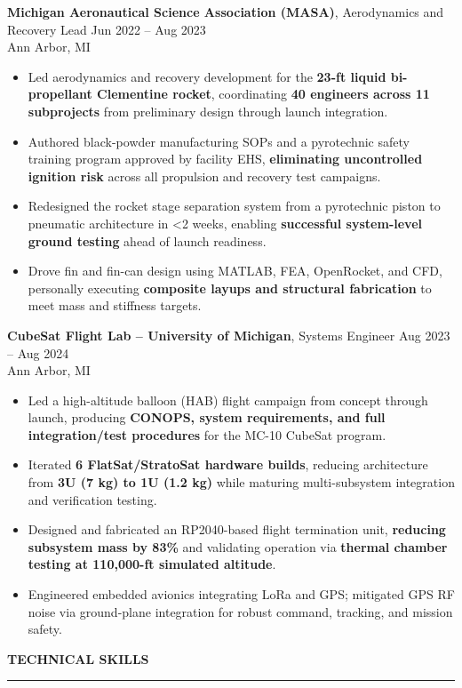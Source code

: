 \documentclass[10pt]{article}
\newcommand{\ressection}[1]{
  \vspace{0.12em}
  {\large\bfseries #1}\par
  \vspace{0.05em}\hrule\vspace{0.12em}
}
\begin{document}
{\bfseries Michigan Aeronautical Science Association (MASA)}, Aerodynamics and Recovery Lead \hfill Jun 2022 -- Aug 2023 \\
Ann Arbor, MI
\begin{itemize}
  \item Led aerodynamics and recovery development for the \textbf{23-ft liquid bi-propellant Clementine rocket}, coordinating \textbf{40 engineers across 11 subprojects} from preliminary design through launch integration.
  \item Authored black-powder manufacturing SOPs and a pyrotechnic safety training program approved by facility EHS, \textbf{eliminating uncontrolled ignition risk} across all propulsion and recovery test campaigns.
  \item Redesigned the rocket stage separation system from a pyrotechnic piston to pneumatic architecture in <2 weeks, enabling \textbf{successful system-level ground testing} ahead of launch readiness.
  \item Drove fin and fin-can design using MATLAB, FEA, OpenRocket, and CFD, personally executing \textbf{composite layups and structural fabrication} to meet mass and stiffness targets.
\end{itemize}

{\bfseries CubeSat Flight Lab -- University of Michigan}, Systems Engineer \hfill Aug 2023 -- Aug 2024 \\
Ann Arbor, MI
\begin{itemize}
  \item Led a high-altitude balloon (HAB) flight campaign from concept through launch, producing \textbf{CONOPS, system requirements, and full integration/test procedures} for the MC-10 CubeSat program.
  \item Iterated \textbf{6 FlatSat/StratoSat hardware builds}, reducing architecture from \textbf{3U (7 kg) to 1U (1.2 kg)} while maturing multi-subsystem integration and verification testing.
  \item Designed and fabricated an RP2040-based flight termination unit, {\bfseries reducing subsystem mass by 83\%} and validating operation via \textbf{thermal chamber testing at 110,000-ft simulated altitude}.
  \item Engineered embedded avionics integrating LoRa and GPS; mitigated GPS RF noise via ground-plane integration for robust command, tracking, and mission safety.
\end{itemize}

\ressection{TECHNICAL SKILLS}
\end{document}
